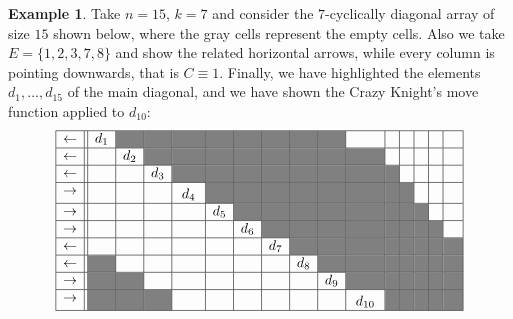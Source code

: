 \documentclass{amsart}
\theoremstyle{definition}
\newtheorem{ex}[prop]{Example}
\numberwithin{equation}{section}
\newcommand\tikzmark[2]{%
\tikz[remember picture,baseline] \node[inner sep=2pt,outer sep=0] (#1){#2};%
}
\begin{document}
\begin{ex} \label{eq:cyclically_diagonal}
Take $n=15$, $k=7$ and consider the $7$-cyclically diagonal array of size $15$ shown below, where the gray cells represent the empty cells. Also we take $E = \{1,2,3,7,8\}$
and  show the related horizontal arrows, while every column is pointing downwards, that is $C\equiv 1$. Finally, we have highlighted the  elements $d_1,\dotsc,d_{15}$ of the main diagonal, and we have shown the Crazy Knight's move function applied to $d_{10}$:
\[
\begin{array}{|c||c|c|c|c|c|c|c|c|c|c|c|c|c|c|c|}\hline
\leftarrow&d_1&\cellcolor{gray}&\cellcolor{gray}&\tikzmark{f}{$\cellcolor{gray}$}&\cellcolor{gray}&\cellcolor{gray}&\cellcolor{gray}&\cellcolor{gray}&\cellcolor{gray}&&&&&& \\ \hline
\leftarrow&&d_2&\cellcolor{gray}&\cellcolor{gray}&\cellcolor{gray}&\cellcolor{gray}&\cellcolor{gray}&\cellcolor{gray}&\cellcolor{gray}&\cellcolor{gray}&&&&& \\ \hline
\leftarrow&&&d_3&\cellcolor{gray}&\cellcolor{gray}&\cellcolor{gray}&\cellcolor{gray}&\cellcolor{gray}&\cellcolor{gray}&\cellcolor{gray}&\cellcolor{gray}&&&& \\ \hline
\rightarrow&&&&\tikzmark{g}{$d_4$}&\cellcolor{gray}&\cellcolor{gray}&\cellcolor{gray}&\cellcolor{gray}&\cellcolor{gray}&\cellcolor{gray}&\cellcolor{gray}&\cellcolor{gray}&&& \\ \hline
\rightarrow&&&&&d_5&\cellcolor{gray}&\cellcolor{gray}&\cellcolor{gray}&\cellcolor{gray}&\cellcolor{gray}&\cellcolor{gray}&\cellcolor{gray}&\cellcolor{gray}&& \\ \hline
\rightarrow&&&&&&d_6&\cellcolor{gray}&\cellcolor{gray}&\cellcolor{gray}&\cellcolor{gray}&\cellcolor{gray}&\cellcolor{gray}&\cellcolor{gray}&\cellcolor{gray}& \\ \hline
\leftarrow&&&&&&&d_7&\cellcolor{gray}&\cellcolor{gray}&\cellcolor{gray}&\cellcolor{gray}&\cellcolor{gray}&\cellcolor{gray}&\cellcolor{gray}&\cellcolor{gray} \\ \hline
\leftarrow&\cellcolor{gray}&&&&&&&d_8&\cellcolor{gray}&\cellcolor{gray}&\cellcolor{gray}&\cellcolor{gray}&\cellcolor{gray}&\cellcolor{gray}&\cellcolor{gray}\\ \hline
\rightarrow&\cellcolor{gray}&\cellcolor{gray}&&&&&&&d_9&\cellcolor{gray}&\cellcolor{gray}&\cellcolor{gray}&\cellcolor{gray}&\cellcolor{gray}&\cellcolor{gray}\\ \hline
\rightarrow&\tikzmark{c}{$\cellcolor{gray}$}&\cellcolor{gray}&\cellcolor{gray}&\tikzmark{d}{}&&&&&&\tikzmark{a}{$d_{10}$}&\cellcolor{gray}&\cellcolor{gray}&\cellcolor{gray}&\cellcolor{gray}&\tikzmark{b}{$\cellcolor{gray}$}\\ \hline

\end{array}\]
\end{ex}
\end{document}
